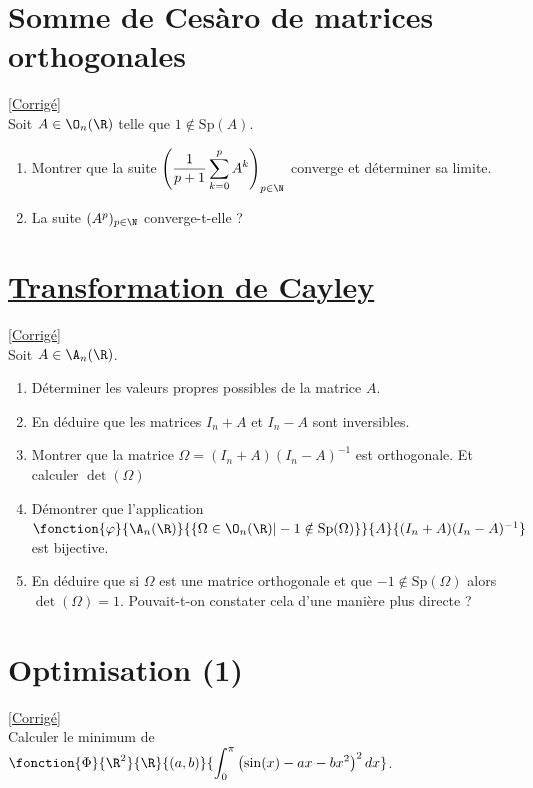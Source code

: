 \documentclass[8pt]{book}
\begin{document}
\section{Somme de Cesàro de matrices orthogonales }
\label{Somme de Cesàro de matrices orthogonales}
\textcolor{blue}{\hyperref[Somme de Cesàro de matrices orthogonales corrigé]{[Corrigé]}}\\
Soit $A\in \O_n(\R)$ telle que $1\notin \text{Sp}(A)$.
\begin{enumerate}
	\item Montrer que la suite $\left(\displaystyle\frac{1}{p+1}\sum_{k=0}^pA^k\right)_{p\in \N}$ converge et déterminer sa limite.
	\item La suite $(A^p)_{p\in \N}$ converge-t-elle ?
\end{enumerate}

\section{\underline{Transformation de Cayley} }
\label{Transformation de Cayley}
\textcolor{blue}{\hyperref[Transformation de Cayley corrigé]{[Corrigé]}}\\
Soit $A\in \A_n(\R)$.
\begin{enumerate}
	\item Déterminer les valeurs propres possibles de la matrice $A$.
	\item En déduire que les matrices $I_n+A$ et $I_n-A$ sont inversibles.
	\item Montrer que la matrice $\Omega=(I_n+A)(I_n-A)^{-1}$ est orthogonale. Et calculer $\det(\Omega)$
	\item Démontrer que l'application $\fonction{\varphi}{\A_n(\R)}{\{\Omega\in \O_n(\R)|-1\notin \text{Sp}(\Omega)\}}{A}{(I_n+A)(I_n-A)^{-1}}$ est bijective.
	\item En déduire que si $\Omega$ est une matrice orthogonale et que $-1\notin \text{Sp}(\Omega)$ alors $\det(\Omega)=1$. Pouvait-t-on constater cela d'une manière plus directe ?
\end{enumerate}

\section{Optimisation (1) }
\label{Optimisation 1}
\textcolor{blue}{\hyperref[Optimisation 1 corrigé]{[Corrigé]}}\\
Calculer le minimum de $\fonction{\Phi}{\R^2}{\R}{(a,b)}{\displaystyle\int_0^{\pi}\left(\sin(x)-ax-bx^2\right)^2dx}$.
\end{document}
